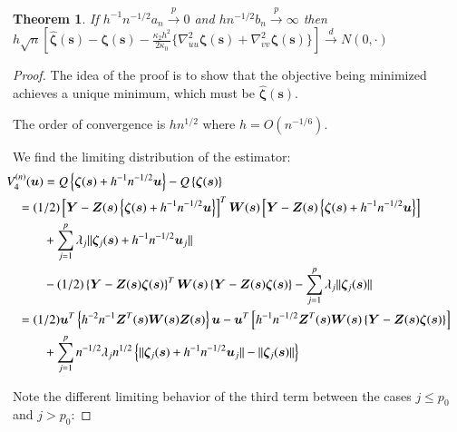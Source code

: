 \documentclass[authoryear, review, 11pt]{elsarticle}
\newtheorem{theorem}{Theorem}[section]
\begin{document}
        \begin{theorem} \label{theorem:normality} 
            If $h^{-1} n^{-1/2} a_n \xrightarrow{p} 0$ and $h n^{-1/2} b_n \xrightarrow{p} \infty$ then $h \sqrt{n} \left[ \hat{\bm{\zeta}}(\bm{s}) - \bm{\zeta}(\bm{s}) - \frac{\kappa_2 h^2}{2 \kappa_0} \{ \nabla_{uu}^2 \bm{\zeta} (\bm{s}) + \nabla_{vv}^2 \bm{\zeta}(\bm{s}) \} \right] \xrightarrow{d} N(0, \cdot)$
        \end{theorem}
  
        \begin{proof} 
            The idea of the proof is to show that the objective being minimized achieves a unique minimum, which must be $\hat{\bm{\zeta}}(\bm{s})$.
    
            The order of convergence is $h n^{1/2}$ where $h = O(n^{-1/6})$.
    
            We find the limiting distribution of the estimator:
            \begin{align}\label{eq:consistency}
                \mkern-36mu V_4^{(n)}(\bm{u}) &= Q \left\{ \bm{\zeta} (\bm{s}) + h^{-1} n^{-1/2} \bm{u} \right\} - Q \left\{ \bm{\zeta}(\bm{s}) \right\} \notag \\
                &\mkern-36mu= (1/2) \left[ \bm{Y} - \bm{Z}(\bm{s}) \left\{ \bm{\zeta}(\bm{s}) + h^{-1} n^{-1/2} \bm{u} \right\} \right]^T \bm{W}(\bm{s}) \left[ \bm{Y} - \bm{Z}(\bm{s}) \left\{ \bm{\zeta}(\bm{s}) + h^{-1} n^{-1/2} \bm{u} \right\} \right] \notag \\
                &+ \sum_{j=1}^p \lambda_j \| \bm{\zeta}_j(\bm{s}) + h^{-1} n^{-1/2} \bm{u}_j \| \notag \\
                &- (1/2) \left\{ \bm{Y} - \bm{Z}(\bm{s}) \bm{\zeta}(\bm{s}) \right\}^T \bm{W}(\bm{s}) \left\{ \bm{Y} - \bm{Z}(\bm{s}) \bm{\zeta}(\bm{s}) \right\} - \sum_{j=1}^p \lambda_j \| \bm{\zeta}_j(\bm{s}) \| \notag \\ 
                &\mkern-36mu= (1/2) \bm{u}^T \left\{ h^{-2} n^{-1} \bm{Z}^T(\bm{s}) \bm{W}(\bm{s}) \bm{Z}(\bm{s}) \right\} \bm{u} - \bm{u}^T \left[ h^{-1} n^{-1/2} \bm{Z}^T(\bm{s}) \bm{W}(\bm{s}) \left\{ \bm{Y} - \bm{Z}(\bm{s}) \bm{\zeta}(\bm{s}) \right\} \right] \notag \\
                &+ \sum_{j=1}^p n^{-1/2} \lambda_j n^{1/2} \left\{ \|\bm{\zeta}_j(\bm{s}) + h^{-1} n^{-1/2} \bm{u}_j \| - \| \bm{\zeta}_j(\bm{s}) \| \right\}
            \end{align}
        
            Note the different limiting behavior of the third term between the cases $j \le p_0$ and $j > p_0$:
        

\end{proof}
\end{document}
